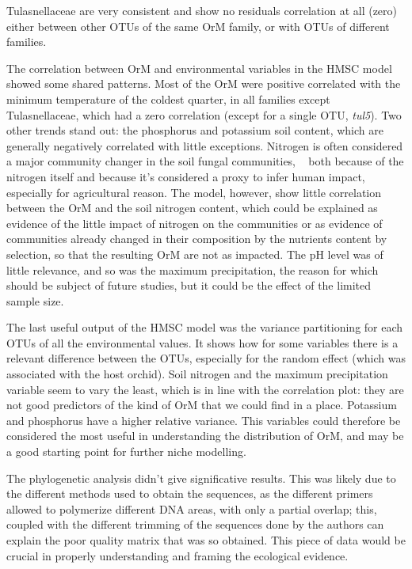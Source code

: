 Tulasnellaceae are very consistent and show no residuals correlation at all (zero) either between other OTUs of the same OrM family, or with OTUs of different families.

The correlation between OrM and environmental variables in the HMSC model showed some shared patterns. Most of the OrM were positive correlated with the minimum temperature of the coldest quarter, in all families except Tulasnellaceae, which had a zero correlation (except for a single OTU, \emph{tul5}). Two other trends stand out: the phosphorus and potassium soil content, which are generally negatively correlated with little exceptions.
Nitrogen is often considered a major community changer in the soil fungal communities, ~\citep{lilleskov2002} both because of the nitrogen itself and because it's considered a proxy to infer human impact, especially for agricultural reason. The model, however, show little correlation between the OrM and the soil nitrogen content, which could be explained as evidence of the little impact of nitrogen on the communities or as evidence of communities already changed in their composition by the nutrients content by selection, so that the resulting OrM are not as impacted.
The pH level was of little relevance, and so was the maximum precipitation, the reason for which should be subject of future studies, but it could be the effect of the limited sample size.

The last useful output of the HMSC model was the variance partitioning for each OTUs of all the environmental values. It shows how for some variables there is a relevant difference between the OTUs, especially for the random effect (which was associated with the host orchid). Soil nitrogen and the maximum precipitation variable seem to vary the least, which is in line with the correlation plot: they are not good predictors of the kind of OrM that we could find in a place. Potassium and phosphorus have a higher relative variance.
This variables could therefore be considered the most useful in understanding the distribution of OrM, and may be a good starting point for further niche modelling.

The phylogenetic analysis didn't give significative results. This was likely due to the different methods used to obtain the sequences, as the different primers allowed to polymerize different DNA areas, with only a partial overlap; this, coupled with the different trimming of the sequences done by the authors can explain the poor quality matrix that was so obtained.
This piece of data would be crucial in properly understanding and framing the ecological evidence.

